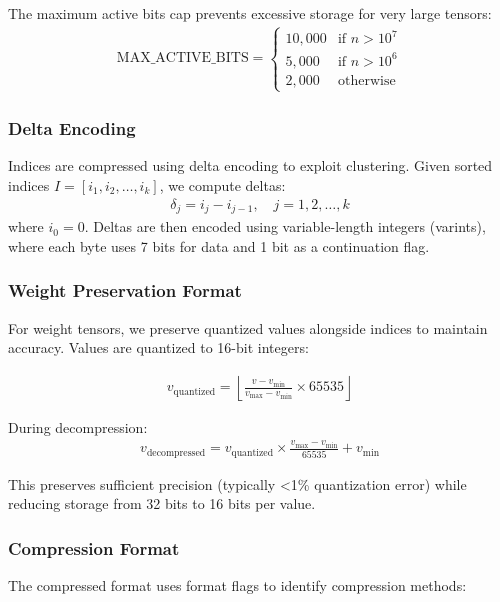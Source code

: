 \documentclass[11pt]{article}
\begin{document}
The maximum active bits cap prevents excessive storage for very large tensors:
\begin{align}
\text{MAX\_ACTIVE\_BITS} = \begin{cases}
10,000 & \text{if } n > 10^7 \\
5,000 & \text{if } n > 10^6 \\
2,000 & \text{otherwise}
\end{cases}
\end{align}

\subsubsection{Delta Encoding}

Indices are compressed using delta encoding to exploit clustering. Given sorted indices $I = [i_1, i_2, \ldots, i_k]$, we compute deltas:
\begin{align}
\delta_j = i_j - i_{j-1}, \quad j = 1, 2, \ldots, k
\end{align}
where $i_0 = 0$. Deltas are then encoded using variable-length integers (varints), where each byte uses 7 bits for data and 1 bit as a continuation flag.

\subsubsection{Weight Preservation Format}

For weight tensors, we preserve quantized values alongside indices to maintain accuracy. Values are quantized to 16-bit integers:

\begin{align}
v_{\text{quantized}} = \left\lfloor \frac{v - v_{\min}}{v_{\max} - v_{\min}} \times 65535 \right\rfloor
\end{align}

During decompression:
\begin{align}
v_{\text{decompressed}} = v_{\text{quantized}} \times \frac{v_{\max} - v_{\min}}{65535} + v_{\min}
\end{align}

This preserves sufficient precision (typically <1\% quantization error) while reducing storage from 32 bits to 16 bits per value.

\subsubsection{Compression Format}

The compressed format uses format flags to identify compression methods:
\end{document}
